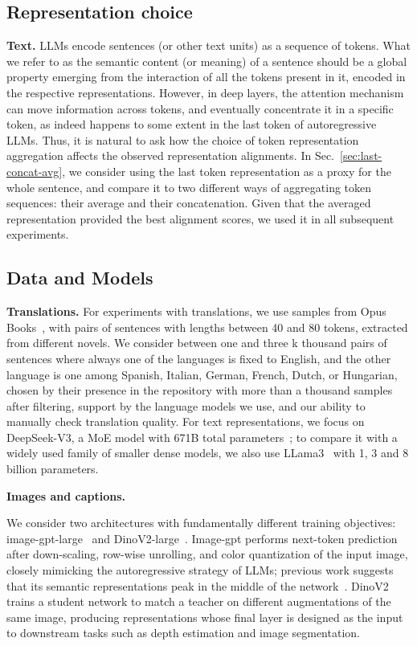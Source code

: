 \documentclass[10pt]{article} %
\begin{document}
\subsection{Representation choice}
\textbf{Text.} LLMs encode sentences (or other text units) as a sequence of tokens. What we refer to as the semantic content (or meaning) of a sentence should be a global property emerging from the interaction of all the tokens present in it, encoded in the respective representations.  
However, in deep layers, the attention mechanism can move information across tokens, and eventually concentrate it in a specific token, as indeed happens to some extent in the last token of autoregressive LLMs.
Thus, it is natural to ask how the choice of token representation aggregation affects the observed representation alignments. 
In Sec.~\ref{sec:last-concat-avg}, we consider using the last token representation as a proxy for the whole sentence, and compare it to two different ways of aggregating token sequences: their average and their concatenation. Given that the averaged representation provided the best alignment scores, we used it in all subsequent experiments. 


\subsection{Data and Models}

\textbf{Translations.} For experiments with translations, we use samples from Opus Books~\citep{opus_books}, with pairs of sentences with lengths between 40 and 80 tokens, extracted from different novels.
We consider between one and three k thousand pairs of sentences where always one of the languages is fixed to English, and the other language is one among Spanish, Italian, German, French, Dutch, or Hungarian, chosen by their presence in the repository with more than a thousand samples after filtering, support by the language models we use, and our ability to manually check translation quality.
%
For text representations, we focus on DeepSeek-V3, a MoE model with 671B total parameters~\citep{deepseekv3}; to compare it with a widely used family of smaller dense models, we also use LLama3~\citep{Meta:2024} with 1, 3 and 8 billion parameters.

\textbf{Images and captions.} 

We consider two architectures with fundamentally different training objectives: image-gpt-large~\citep{pmlr-v119-chen20s} and DinoV2-large~\citep{oquabDINOv2LearningRobust2024}. Image-gpt performs next-token prediction after down-scaling, row-wise unrolling, and color quantization of the input image, closely mimicking the autoregressive strategy of LLMs; previous work suggests that its semantic representations peak in the middle of the network~\citep{pmlr-v119-chen20s}. DinoV2 trains a student network to match a teacher on different augmentations of the same image, producing representations whose final layer is designed as the input to downstream tasks such as depth estimation and image segmentation. 
\end{document}
